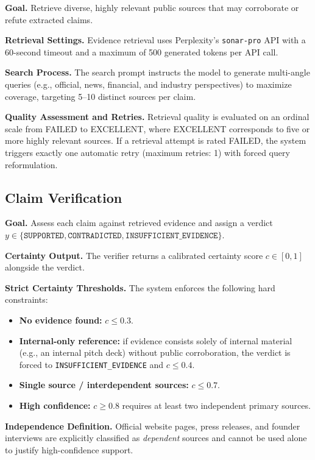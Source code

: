 \textbf{Goal.} Retrieve diverse, highly relevant public sources that may corroborate or refute extracted claims.

\textbf{Retrieval Settings.} Evidence retrieval uses Perplexity's \texttt{sonar-pro} API with a 60-second timeout and a maximum of 500 generated tokens per API call.

\textbf{Search Process.} The search prompt instructs the model to generate multi-angle queries (e.g., official, news, financial, and industry perspectives) to maximize coverage, targeting 5--10 distinct sources per claim.

\textbf{Quality Assessment and Retries.} Retrieval quality is evaluated on an ordinal scale from \textsc{FAILED} to \textsc{EXCELLENT}, where \textsc{EXCELLENT} corresponds to five or more highly relevant sources. If a retrieval attempt is rated \textsc{FAILED}, the system triggers exactly one automatic retry (maximum retries: 1) with forced query reformulation.

\subsection{Claim Verification}
\label{app:claim_verification}

\textbf{Goal.} Assess each claim against retrieved evidence and assign a verdict
$y \in \{\texttt{SUPPORTED}, \texttt{CONTRADICTED}, \texttt{INSUFFICIENT\_EVIDENCE}\}$.

\textbf{Certainty Output.} The verifier returns a calibrated certainty score $c \in [0,1]$ alongside the verdict.

\textbf{Strict Certainty Thresholds.} The system enforces the following hard constraints:
\begin{itemize}
    \item \textbf{No evidence found:} $c \le 0.3$.
    \item \textbf{Internal-only reference:} if evidence consists solely of internal material (e.g., an internal pitch deck) without public corroboration, the verdict is forced to \texttt{INSUFFICIENT\_EVIDENCE} and $c \le 0.4$.
    \item \textbf{Single source / interdependent sources:} $c \le 0.7$.
    \item \textbf{High confidence:} $c \ge 0.8$ requires at least two independent primary sources.
\end{itemize}

\textbf{Independence Definition.} Official website pages, press releases, and founder interviews are explicitly classified as \emph{dependent} sources and cannot be used alone to justify high-confidence support.

